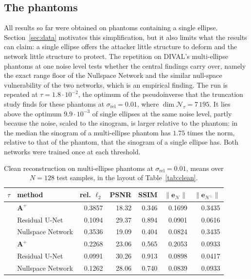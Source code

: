 \documentclass{article}
\numberwithin{equation}{section}
\begin{document}
\subsection{The phantoms}\label{sec:results-data}
All results so far were obtained on phantoms containing a single ellipse. Section~\ref{sec:data}
motivates this simplification, but it also limits what the results can claim: a single ellipse
offers the attacker little structure to deform and the network little structure to protect. The
repetition on DIVAL's multi-ellipse phantoms at one noise level tests whether the central findings
carry over, namely the exact range floor of the Nullspace Network and the similar null-space
vulnerability of the two networks, which is an empirical finding.
The run is repeated at $\tau=1.8\cdot10^{-2}$, the optimum of the pseudoinverse that the truncation study
finds for these phantoms at $\sigma_\text{rel}=0.01$, where $\dim\mathcal{N}_\tau=7\,195$. It lies above
the optimum $9.9\cdot10^{-3}$ of single ellipses at the same noise level, partly because the noise, scaled to the
sinogram, is larger relative to the phantom: in the median the sinogram of a multi-ellipse phantom has
$1.75$ times the norm, relative to that of the phantom, that the sinogram of a single ellipse has. Both
networks were trained once at each threshold.\\
\begin{table}[htbp]
\centering
\caption{Clean reconstruction on multi-ellipse phantoms at $\sigma_\text{rel}=0.01$, means over $N=128$
test samples, in the layout of Table~\ref{tab:clean}.}\label{tab:clean-ellipses}
\small\setlength{\tabcolsep}{4pt}
\begin{tabular}{l l r r r r r}
\toprule
$\tau$ & method & rel. $\ell_2$ & PSNR & SSIM &
$\lVert\mathbf{e}_{\mathcal{N}}\rVert$ & $\lVert\mathbf{e}_{\mathcal{N}^\perp}\rVert$ \\
\midrule
{}
 & $\mathbf{A}^{+}$ & 0.3857 & 18.32 & 0.346 & 0.1699 & 0.3435 \\
 & Residual U-Net & 0.1094 & 29.37 & 0.894 & 0.0901 & 0.0616 \\
 & Nullspace Network & 0.3536 & 19.09 & 0.404 & 0.0824 & 0.3435 \\
\midrule
{}
 & $\mathbf{A}^{+}$ & 0.2268 & 23.06 & 0.565 & 0.2053 & 0.0933 \\
 & Residual U-Net & 0.0991 & 30.26 & 0.913 & 0.0898 & 0.0417 \\
 & Nullspace Network & 0.1262 & 28.06 & 0.740 & 0.0839 & 0.0933 \\
\bottomrule
\end{tabular}
\end{table}
\end{document}
